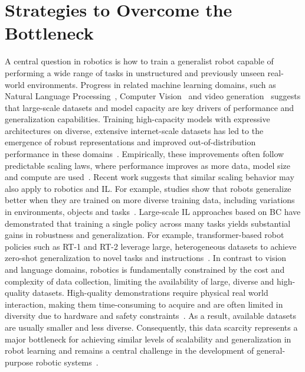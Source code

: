 \section{Strategies to Overcome the Bottleneck}
A central question in robotics is how to train a generalist robot capable of performing a wide range of tasks in unstructured and previously unseen real-world environments.
Progress in related machine learning domains, such as Natural Language Processing~\cite{Achiam2023GPT4TR}, Computer Vision~\cite{betkerImprovingImageGeneration} and video generation~\cite{videoworldsimulators2024} suggests that large-scale datasets and model capacity are key drivers of performance and generalization capabilities. 
Training high-capacity models with expressive architectures on diverse, extensive internet-scale datasets has led to the emergence of robust representations and improved out-of-distribution performance in these domains~\cite{Vaswani2017AttentionIA}.
Empirically, these improvements often follow predictable scaling laws, where performance improves as more data, model size and compute are used~\cite{kaplan2020scalinglawsneurallanguage}.
Recent work suggests that similar scaling behavior may also apply to robotics and \ac{IL}. For example, studies show that robots generalize better when they are trained on more diverse training data, including variations in environments, objects and tasks~\cite{lin2024data,open_x_embodiment_rt_x_2023}. Large-scale \ac{IL} approaches based on \ac{BC} have demonstrated that training a single policy across many tasks yields substantial gains in robustness and generalization. For example, transformer-based robot policies such as RT-1 and RT-2 leverage large, heterogeneous datasets to achieve zero-shot generalization to novel tasks and instructions~\cite{rt12022arxiv, rt22023arxiv}.
In contrast to vision and language domains, robotics is fundamentally constrained by the cost and complexity of data collection, limiting the availability of large, diverse and high-quality datasets. High-quality demonstrations require physical real world interaction, making them time-consuming to acquire and are often limited in diversity due to hardware and safety constraints~\cite{tsujiSurveyImitationLearning2026}.
As a result, available datasets are usually smaller and less diverse. Consequently, this data scarcity represents a major bottleneck for achieving similar levels of scalability and generalization in robot learning and remains a central challenge in the development of general-purpose robotic systems~\cite{tsujiSurveyImitationLearning2026}.



